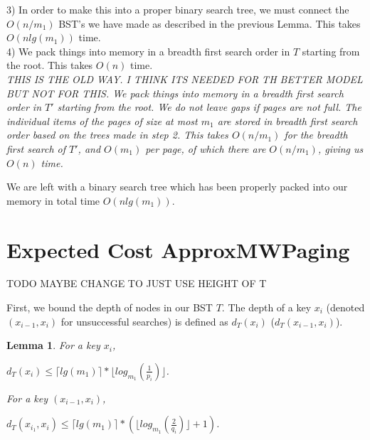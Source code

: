 \documentclass[letterpaper,12pt,titlepage,oneside,final]{book}
\theoremstyle{plain}
\newtheorem{lem}[thm]{Lemma}
\begin{document}
3) In order to make this into a proper binary search tree, we must connect the $O(n/m_1)$ BST's we have made as described in the previous Lemma. This takes $O(n lg(m_1))$ time. \\

4) We pack things into memory in a breadth first search order in $T$ starting from the root. This takes $O(n)$ time. \\


\textit{THIS IS THE OLD WAY. I THINK ITS NEEDED FOR TH BETTER MODEL BUT NOT FOR THIS. We pack things into memory in a breadth first search order in $T'$ starting from the root. We do not leave gaps if pages are not full. The individual items of the pages of size at most $m_1$ are stored in breadth first search order based on the trees made in step 2. This takes $O(n/m_1)$ for the breadth first search of $T'$, and $O(m_1)$ per page, of which there are $O(n/m_1)$, giving us $O(n)$ time.\\} 

We are left with a binary search tree which has been properly packed into our memory in total time $O(n lg(m_1))$.

\section{Expected Cost ApproxMWPaging}
TODO MAYBE CHANGE TO JUST USE HEIGHT OF T


First, we bound the depth of nodes in our BST $T$. The depth of a key $x_i$ (denoted $(x_{i-1}, x_i)$ for unsuccessful searches) is defined as $d_T(x_i)$ ($d_T(x_{i-1},x_i)$).

\begin{lem}
For a key $x_i$,
\begin{center} $d_T(x_i) \leq \lceil lg(m_1) \rceil * \lfloor log_{m_1}(\frac{1}{p_i}) \rfloor$. \end{center}
For a key $(x_{i-1},x_i)$,
\begin{center} $d_T(x_{i_1},x_i) \leq \lceil lg(m_1) \rceil * (\lfloor log_{m_1}(\frac{2}{q_i}) \rfloor + 1)$. \end{center}
\end{lem}
\end{document}
